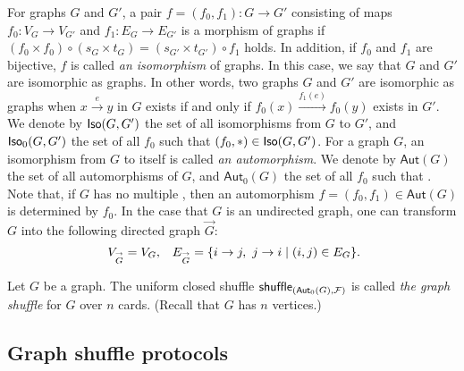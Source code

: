 For graphs $G$ and $G'$, a pair $f=(f_0,f_1):G\to G'$ consisting of maps $f_0:V_G\to V_{G'}$ and $f_1:E_G\to E_{G'}$ is a morphism of graphs if $(f_0\times f_0)\circ(s_G\times t_G)=(s_{G'}\times t_{G'})\circ f_1$ holds. In addition, if $f_0$ and $f_1$ are bijective, $f$ is called  \textit{an isomorphism} of graphs. In this case, we say that $G$ and $G'$ are isomorphic as graphs. 
In other words, two graphs $G$ and $G'$ are isomorphic as graphs when $x\xrightarrow{e}y$ in $G$ exists if and only if $f_0(x)\xrightarrow{f_1(e)}f_0(y)$ exists in $G'$.
We denote by $\mathsf{Iso}(G,G')$ the set of all isomorphisms from $G$ to $G'$, and $\mathsf{Iso}_0(G,G')$ the set of all $f_0$ such that $(f_0, *) \in \mathsf{Iso}(G,G')$.
For a graph $G$, an isomorphism from $G$ to itself is called \textit{an automorphism}.
We denote by $\mathsf{Aut}(G)$ the set of all automorphisms of $G$, and $\mathsf{Aut}_0(G)$ the set of all $f_0$ such that . 
Note that, if $G$ has no multiple , then an automorphism $f = (f_0, f_1)\in \mathsf{Aut}(G)$ is determined by $f_0$. 
In the case that $G$ is an undirected graph, one can transform $G$ into the following directed graph $\overset{\to}{G}$:
\[ \text{ $V_{\overset{\to}{G}}=V_G$,\quad $E_{\overset{\to}{G}}=\{i\to j, \ j\to i\mid (i,j) \in E_G\}$}. \]

\begin{definition}\label{def:graphshuffle}
Let $G$ be a graph. 
The uniform closed shuffle $\mathsf{shuffle}_{(\mathsf{Aut}_0(G), \mathcal{F})}$ is called  \textit{the graph shuffle} for $G$ over $n$ cards. (Recall that $G$ has $n$ vertices.)
\end{definition}

\subsection{Graph shuffle protocols}\label{ss:graphprotocol}


